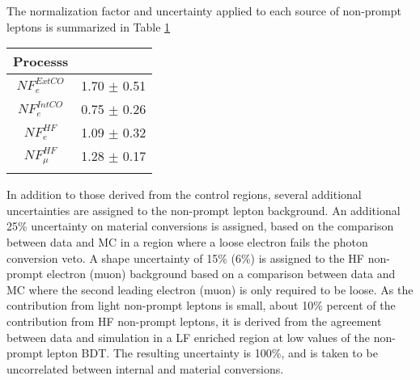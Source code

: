 The normalization factor and uncertainty applied to each source of non-prompt leptons is summarized in Table \ref{tab:fakeNF}

\begin{table}[H]
\begin{center}
\begin{tabular}{c|c}
\hline\hline
Processs &  \\
\hline
$NF_e^{ExtCO}$ & 1.70 $\pm$ 0.51 \\
$NF_e^{IntCO}$ & 0.75 $\pm$ 0.26 \\
$NF_e^{HF}$ & 1.09 $\pm$ 0.32 \\
$NF_{\mu}^{HF}$ & 1.28 $\pm$ 0.17 \\
\hline
\label{tab:fakeNF}
\end{tabular}
\end{center}
\end{table}

In addition to those derived from the control regions, several additional uncertainties are assigned to the non-prompt lepton background. An additional 25\% uncertainty on material conversions is assigned, based on the comparison between data and MC in a region where a loose electron fails the photon conversion veto. A shape uncertainty of 15\% (6\%) is assigned to the HF non-prompt electron (muon) background based on a comparison between data and MC where the second leading electron (muon) is only required to be loose. As the contribution from light non-prompt leptons is small, about 10\% percent of the contribution from HF non-prompt leptons, it is derived from the agreement between data and simulation in a LF enriched region at low values of the non-prompt lepton BDT. The resulting uncertainty is 100\%, and is taken to be uncorrelated between internal and material conversions.
